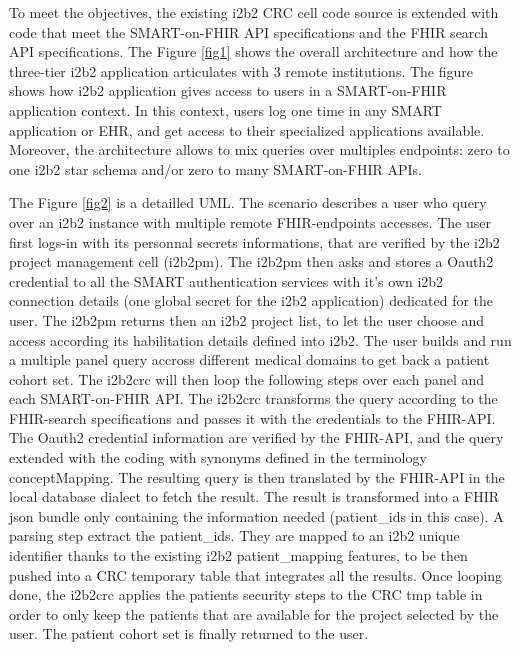 \documentclass{amia}
\begin{document}
To meet the objectives, the existing i2b2 CRC cell code source is extended with code that meet the SMART-on-FHIR API specifications and the FHIR search API specifications. The Figure \ref{fig1} shows the overall architecture and how the three-tier i2b2 application articulates with 3 remote institutions. The figure shows how i2b2 application gives access to users in a SMART-on-FHIR application context. In this context, users log one time in any SMART application or EHR, and get access to their specialized applications available. Moreover, the architecture allows to mix queries over multiples endpoints: zero to one i2b2 star schema and/or zero to many SMART-on-FHIR APIs.


The Figure \ref{fig2} is a detailled UML. The scenario describes a user who query over an i2b2 instance with multiple remote FHIR-endpoints accesses. 
The user first logs-in with its personnal secrets informations, that are verified by the i2b2 project management cell (i2b2pm). The i2b2pm then asks and stores a Oauth2 credential to all the SMART authentication services with it's own i2b2 connection details (one global secret for the i2b2 application) dedicated for the user. The i2b2pm returns then an i2b2 project list, to let the user choose and access according its habilitation details defined into i2b2. The user builds and run a multiple panel query accross different medical domains to get back a patient cohort set. The i2b2crc will then loop the following steps over each panel and each SMART-on-FHIR API. The i2b2crc transforms the query according to the FHIR-search specifications  and passes it with the credentials to the FHIR-API. The Oauth2 credential information are verified by the FHIR-API, and the query extended with the coding with synonyms defined in the terminology conceptMapping. The resulting query is then translated by the FHIR-API in the local database dialect to fetch the result. The result is transformed into a FHIR json bundle only containing the information needed (patient\_ids in this case). A parsing step extract the patient\_ids. They are mapped to an i2b2 unique identifier thanks to the existing i2b2 patient\_mapping features, to be then pushed into a CRC temporary table that integrates all the results. Once looping done, the i2b2crc applies the patients security steps to the CRC tmp table in order to only keep the patients that are available for the project selected by the user. The patient cohort set is finally returned to the user.
\end{document}
